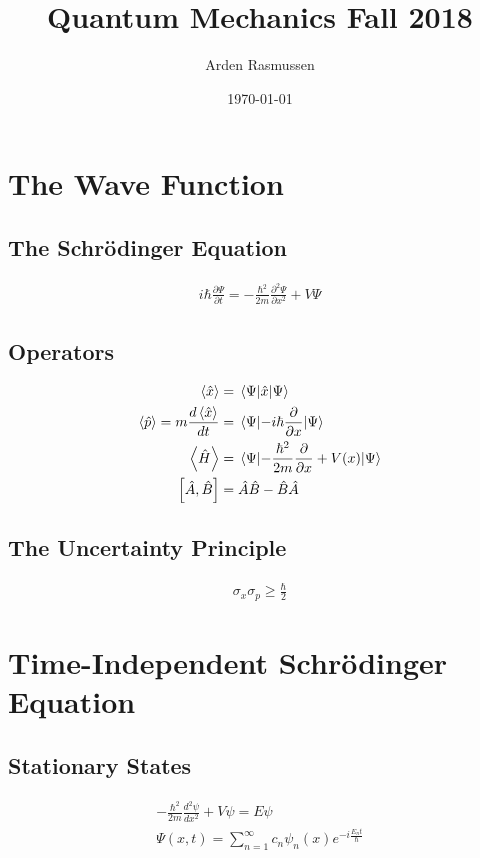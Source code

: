 \documentclass[8pt]{amsart}
\title{Quantum Mechanics Fall 2018}
\author{Arden Rasmussen}
\date{\today}
\newcommand{\pder}[2][]{\frac{\partial#1}{\partial#2}}
\newcommand{\spder}[2][]{\frac{\partial^2 #1}{\partial#2^2}}
\newcommand{\sder}[2][]{\frac{d^2#1}{d#2^2}}
\newcommand{\x}{\hat{x}}
\newcommand{\p}{\hat{p}}
\newcommand{\h}{\hat{H}}
\begin{document}
\maketitle
\begin{multicols}{3}

\section{The Wave Function}%
\label{sec:the_wave_function}

\subsection{The Schr\"odinger Equation}%
\label{sub:the_schr"odinger_equation}
\begin{align*}
  i\hbar\pder[\Psi]{t}=-\frac{\hbar^2}{2m}\spder[\Psi]{x}+V\Psi
\end{align*}

\subsection{Operators}%
\label{sub:operators}
\begin{align*}
  \expval{\x}&=\expval{\x}{\Psi}\\
  \expval{\p}=m\frac{d\expval{\x}}{dt}&=\expval{-i\hbar\pder{x}}{\Psi}\\
  \expval{\h}&=\expval{-\frac{\hbar^2}{2m}\pder{x}+V(x)}{\Psi}\\
  \left[\hat{A},\hat{B}\right]&=\hat{A}\hat{B}-\hat{B}\hat{A}
\end{align*}

\subsection{The Uncertainty Principle}%
\label{sub:the_uncertainty_principle}
\begin{align*}
  \sigma_x\sigma_p\geq\frac{\hbar}{2}
\end{align*}

\section{Time-Independent Schr\"odinger Equation}%
\label{sec:time_independent_schr"odinger_equation}

\subsection{Stationary States}%
\label{sub:stationary_states}
\begin{align*}
  -\frac{\hbar^2}{2m}\sder[\psi]{x}+V\psi=E\psi\\
  \Psi(x,t)=\sum_{n=1}^\infty c_n\psi_n(x)e^{-i\frac{E_nt}{\hbar}}
\end{align*}


\end{multicols}
\end{document}
